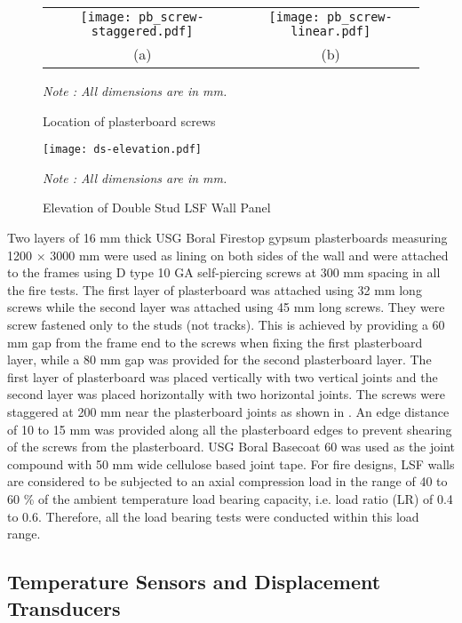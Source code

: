 \begin{figure}[!htbp]
	\centering
				\begin{tabular}{cc}
			\texttt{[image: pb\_screw-staggered.pdf]} & 
			\texttt{[image: pb\_screw-linear.pdf]} \\
			(a) & (b) \\ 
		\end{tabular} 
		\caption{Location of plasterboard screws}
		\label{fig:screw}
		\fontsize{10}{1}\textit{Note : All dimensions are in mm.}
\end{figure}
\begin{figure}[!htbp]
	\centering
		\texttt{[image: ds-elevation.pdf]}
		\caption{Elevation of Double Stud LSF Wall Panel}
		\label{fig:ds-elevation}
		\fontsize{10}{1}\textit{Note : All dimensions are in mm.}
\end{figure}

Two layers of 16 mm thick USG Boral Firestop gypsum plasterboards measuring 1200 \(\times\) 3000 mm were used as lining on both sides of the wall and were attached to the frames using D type 10 GA self-piercing screws at 300 mm spacing in all the fire tests. The first layer of plasterboard was attached using 32 mm long screws while the second layer was attached using 45 mm long screws. They were screw fastened only to the studs (not tracks). This is achieved by providing a 60 mm gap from the frame end to the screws when fixing the first plasterboard layer, while a 80 mm gap was provided for the second plasterboard layer. The first layer of plasterboard was placed vertically with two vertical joints and the second layer was placed horizontally with two horizontal joints. The screws were staggered at 200 mm near the plasterboard joints as shown in . An edge distance of 10 to 15 mm was provided along all the plasterboard edges to prevent shearing of the screws from the plasterboard. USG Boral Basecoat 60 was used as the joint compound with 50 mm wide cellulose based joint tape. For fire designs, LSF walls are considered to be subjected to an axial compression load in the range of 40 to 60 \% of the ambient temperature load bearing capacity, i.e. load ratio (LR) of 0.4 to 0.6. Therefore, all the load bearing tests were conducted within this load range.

\subsection{Temperature Sensors and Displacement Transducers}

